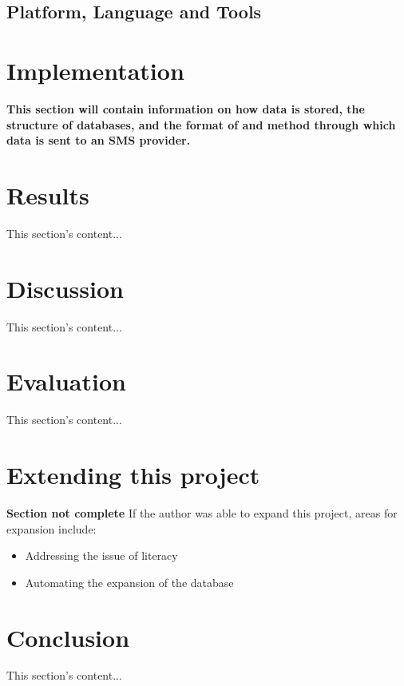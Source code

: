 \documentclass{article}
\begin{document}
\subsection{Platform, Language and Tools}

\newpage
\section{Implementation}
\label{sec:implementation}
{\bf This section will contain information on how data is stored, the structure of databases, and the format of and method through which data is sent to an SMS provider.}

\newpage
\section{Results}
\label{sec:results}
This section's content...

\newpage
\section{Discussion}
\label{sec:discussion}
This section's content...

\newpage

\newpage
\section{Evaluation}
\label{sec:evaluation}
This section's content...

\newpage

\section{Extending this project}
\label{sec:extending}
{\bf Section not complete} %
If the author was able to expand this project, areas for expansion include:
\begin{itemize}
  \item Addressing the issue of literacy
  \item Automating the expansion of the database
\end{itemize}

\newpage

\section{Conclusion}
\label{sec:conclusion}
This section's content...
\end{document}
